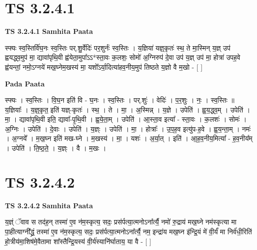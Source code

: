 \documentclass[17pt]{extarticle}
\begin{document}

\section{ TS 3.2.4.1 }

\textbf{TS 3.2.4.1 } \newline
\textbf{Samhita Paata} \newline

स्फ्यः स्व॒स्तिर्वि॑घ॒नः स्व॒स्तिः पर्.शु॒र्वेदिः॑ पर॒शुर्नः॑ स्व॒स्तिः । य॒ज्ञिया॑ यज्ञ्॒कृतः॑ स्थ॒ ते मा॒स्मिन् य॒ज्ञ् उप॑ ह्वयद्ध्व॒मुप॑ मा॒ द्यावा॑पृथि॒वी ह्व॑येता॒मुपा᳚ऽऽ*स्ता॒वः क॒लशः॒ सोमो॑ अ॒ग्निरुप॑ दे॒वा उप॑ य॒ज्ञ् उप॑ मा॒ होत्रा॑ उपह॒वे ह्व॑यन्तां॒ नमो॒ऽग्नये॑ मख॒घ्नेम॒खस्य॑ मा॒ यशो᳚ऽर्या॒दित्या॑हव॒नीय॒मुप॑ तिष्ठते य॒ज्ञो वै म॒खो - [  ] \newline

\textbf{Pada Paata} \newline

स्फ्यः । स्व॒स्तिः । वि॒घ॒न इति॑ वि - घ॒नः । स्व॒स्तिः । पर्.शुः॑ । वेदिः॑ । प॒र॒शुः । नः॒ । स्व॒स्तिः ॥ य॒ज्ञियाः᳚ । य॒ज्ञ्॒कृत॒ इति॑ यज्ञ्-कृतः॑ । स्थ॒ । ते । मा॒ । अ॒स्मिन्न् । य॒ज्ञे । उपेति॑ । ह्व॒य॒द्ध्व॒म् । उपेति॑ । मा॒ । द्यावा॑पृथि॒वी इति॒ द्यावा᳚-पृ॒थि॒वी । ह्व॒ये॒ता॒म् । उपेति॑ । आ॒स्ता॒व इत्या᳚ - स्ता॒वः । क॒लशः॑ । सोमः॑ । अ॒ग्निः । उपेति॑ । दे॒वाः । उपेति॑ । य॒ज्ञ्ः । उपेति॑ । मा॒ । होत्राः᳚ । उ॒प॒ह॒व इत्यु॑प-ह॒वे । ह्व॒य॒न्ता॒म् । नमः॑ । अ॒ग्नये᳚ । म॒ख॒घ्न इति॑ मख-घ्ने । म॒खस्य॑ । मा॒ । यशः॑ । अ॒र्या॒त् । इति॑ । आ॒ह॒व॒नीय॒मित्या᳚ - ह॒व॒नीय᳚म् । उपेति॑ । ति॒ष्ठ॒ते॒ । य॒ज्ञ्ः । वै । म॒खः ।  \newline





\section{ TS 3.2.4.2 }

\textbf{TS 3.2.4.2 } \newline
\textbf{Samhita Paata} \newline

य॒ज्ञ्ं ॅवाव स तद॑ह॒न् तस्मा॑ ए॒व न॑म॒स्कृत्य॒ सदः॒ प्रस॑र्पत्या॒त्मनोऽना᳚र्त्यै॒ नमो॑ रु॒द्राय॑ मख॒घ्ने नम॑स्कृत्या मा पा॒हीत्याग्नी᳚द्ध्रं॒ तस्मा॑ ए॒व न॑म॒स्कृत्य॒ सदः॒ प्रस॑र्पत्या॒त्मनोऽना᳚र्त्यै॒ नम॒ इन्द्रा॑य मख॒घ्न इ॑न्द्रि॒यं मे॑ वी॒र्यं॑ मा निर्व॑धी॒रिति॑ हो॒त्रीय॑मा॒शिष॑मे॒वैतामा शा᳚स्तैन्द्रि॒यस्य॑ वी॒र्य॑स्यानि॑र्घाताय॒ या वै - [  ] \newline
\end{document}
